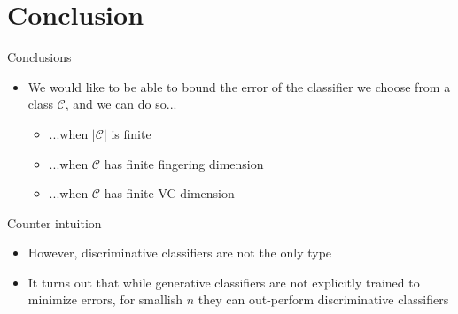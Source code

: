 \documentclass{beamer}
\newcommand{\cls}{\mathcal{C}}
\newcommand{\abs}[1]{\left| #1 \right|}
\begin{document}

\section{Conclusion}
\begin{frame}{Conclusions}
\begin{itemize}
\item We would like to be able to bound the error of the classifier we choose from a class $\cls$, and we can do so...
\begin{itemize}
\item ...when $\abs{\cls}$ is finite
\item ...when $\cls$ has finite fingering dimension
\item ...when $\cls$ has finite VC dimension
\end{itemize}
\end{itemize}
\end{frame}

\begin{frame}{Counter intuition}
\begin{itemize}
\item However, discriminative classifiers are not the only type
\item It turns out that while generative classifiers are not explicitly trained to minimize errors, for smallish $n$ they can out-perform discriminative classifiers
\end{itemize}
\end{frame}
\end{document}

